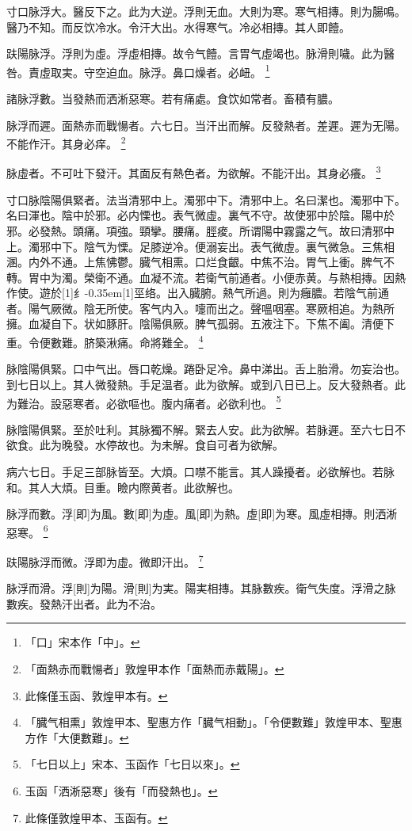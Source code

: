 \documentclass[oneside,b4paper]{ctexbook}
\begin{document}
\begin{flushleft}
寸口脉浮大。醫反下之。此为大逆。浮則无血。大則为寒。寒气相摶。則为腸鳴。醫乃不知。而反饮冷水。令汗大出。水得寒气。冷必相摶。其人即饐。

趺陽脉浮。浮則为虛。浮虛相摶。故令气饐。言胃气虛竭也。脉滑則噦。此为醫咎。責虛取実。守空迫血。脉浮。鼻口燥者。必衄。
\footnote{「口」宋本作「中」。}

諸脉浮數。当發熱而洒淅惡寒。若有痛處。食饮如常者。畜積有膿。

脉浮而遲。面熱赤而戰愓者。六七日。当汗出而解。反發熱者。差遲。遲为无陽。不能作汗。其身必痒。
\footnote{「面熱赤而戰愓者」敦煌甲本作「面熱而赤戴陽」。}

脉虛者。不可吐下發汗。其面反有熱色者。为欲解。不能汗出。其身必癢。
\footnote{此條僅玉函、敦煌甲本有。}

寸口脉陰陽俱緊者。法当清邪中上。濁邪中下。清邪中上。名曰潔也。濁邪中下。名曰渾也。陰中於邪。必内慄也。表气微虛。裏气不守。故使邪中於陰。陽中於邪。必發熱。頭痛。項強。頸攣。腰痛。脛痠。所谓陽中霧露之气。故曰清邪中上。濁邪中下。陰气为慄。足膝逆冷。便溺妄出。表气微虛。裏气微急。三焦相溷。内外不通。上焦怫鬱。臓气相熏。口烂食齦。中焦不治。胃气上衝。脾气不轉。胃中为濁。榮衛不通。血凝不流。若衛气前通者。小便赤黄。与熱相摶。因熱作使。遊於{\hbox{\scalebox{0.68}[1]{纟}\kern-0.35em\scalebox{0.64}[1]{巠}}}络。出入臓腑。熱气所過。則为癰膿。若陰气前通者。陽气厥微。陰无所使。客气内入。嚏而出之。聲嗢咽塞。寒厥相追。为熱所擁。血凝自下。状如豚肝。陰陽俱厥。脾气孤弱。五液注下。下焦不阖。清便下重。令便數難。脐築湫痛。命將難全。
\footnote{「臓气相熏」敦煌甲本、聖惠方作「臓气相動」。「令便數難」敦煌甲本、聖惠方作「大便數難」。}

脉陰陽俱緊。口中气出。唇口乾燥。踡卧足冷。鼻中涕出。舌上胎滑。勿妄治也。到七日以上。其人微發熱。手足温者。此为欲解。或到八日已上。反大發熱者。此为難治。設惡寒者。必欲嘔也。腹内痛者。必欲利也。
\footnote{「七日以上」宋本、玉函作「七日以來」。}

脉陰陽俱緊。至於吐利。其脉獨不解。緊去人安。此为欲解。若脉遲。至六七日不欲食。此为晚發。水停故也。为未解。食自可者为欲解。

病六七日。手足三部脉皆至。大煩。口噤不能言。其人躁擾者。必欲解也。若脉和。其人大煩。目重。瞼内際黄者。此欲解也。

脉浮而數。浮[即]为風。數[即]为虛。風[即]为熱。虛[即]为寒。風虛相摶。則洒淅惡寒。
\footnote{玉函「洒淅惡寒」後有「而發熱也」。}

趺陽脉浮而微。浮即为虛。微即汗出。
\footnote{此條僅敦煌甲本、玉函有。}

脉浮而滑。浮[則]为陽。滑[則]为実。陽実相摶。其脉數疾。衛气失度。浮滑之脉數疾。發熱汗出者。此为不治。


\end{flushleft}
\end{document}
